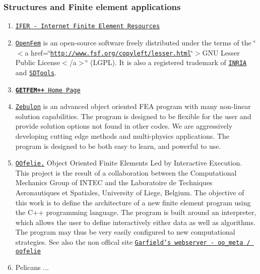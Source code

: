 \hypertarget{related_ems_2}{}\subsubsection{Structures and Finite element applications}\label{related_ems_2}
\begin{enumerate}
\item \href{http://www.engr.usask.ca/%7Emacphed/finite/fe_resources/fe_resources.html}{\tt IFER - Internet Finite Element Resources}\item \href{http://www.openfem.net}{\tt Open\-Fem} is an open-source software freely distributed under the terms of the \char`\"{}$<$a href=\char`\"{}\href{http://www.fsf.org/copyleft/lesser.html}{\tt http://www.fsf.org/copyleft/lesser.html}\char`\"{}$>$GNU Lesser Public License$<$/a$>$\char`\"{} (LGPL). It is also a registered trademark of \href{http://www.inria.fr}{\tt INRIA} and \href{http://www.sdtools.com}{\tt SDTools}.\item \href{http://www.gmm.insa-tlse.fr/getfem/}{\tt {\bf GETFEM++} Home Page}\item \href{http://www.nwnumerics.com}{\tt Zebulon} is an advanced object oriented FEA program with many non-linear solution capabilities. The program is designed to be flexible for the user and provide solution options not found in other codes. We are aggressively developing cutting edge methods and multi-physics applications. The program is designed to be both easy to learn, and powerful to use.\item \href{http://venus.arcride.edu.ar/oofelie.html}{\tt OOfelie.} Object Oriented Finite Elements Led by Interactive Execution. This project is the result of a collaboration between the Computational Mechanics Group of INTEC and the Laboratoire de Techniques Aeronautiques et Spatiales, University of Liege, Belgium. The objective of this work is to define the architecture of a new finite element program using the C++ programming language. The program is built around an interpreter, which allows the user to define interactively either data as well as algorithms. The program may thus be very easily configured to new computational strategies. See also the non offical site \href{http://garfield.ltas.ulg.ac.be/oo_meta/fr_oometa.htm}{\tt Garfield's webserver - oo\_\-meta / oofelie}\item Pelicans ... \end{enumerate}
